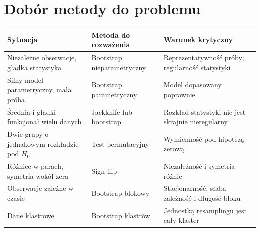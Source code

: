 \section{Dobór metody do problemu}
\begin{center}\small
\begin{tabular}{>{\raggedright\arraybackslash}p{}>{\raggedright\arraybackslash}p{}>{\raggedright\arraybackslash}p{}}
\toprule
\textbf{Sytuacja} & \textbf{Metoda do rozważenia} & \textbf{Warunek krytyczny}\\
\midrule
Niezależne obserwacje, gładka statystyka & Bootstrap nieparametryczny & Reprezentatywność próby; regularność statystyki\\
Silny model parametryczny, mała próba & Bootstrap parametryczny & Model dopasowany poprawnie\\
Średnia i gładki funkcjonał wielu danych & Jackknife lub bootstrap & Rozkład statystyki nie jest skrajnie nieregularny\\
Dwie grupy o jednakowym rozkładzie pod $H_0$ & Test permutacyjny & Wymienność pod hipotezą zerową\\
Różnice w parach, symetria wokół zera & Sign-flip & Niezależność i symetria różnic\\
Obserwacje zależne w czasie & Bootstrap blokowy & Stacjonarność, słaba zależność i długość bloku\\
Dane klastrowe & Bootstrap klastrów & Jednostką resamplingu jest cały klaster\\
\bottomrule
\end{tabular}
\end{center}

